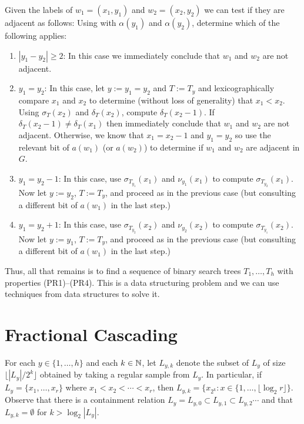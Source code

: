 \documentclass[kpfonts]{patmorin}
\begin{document}
Given the labels of $w_1=(x_1,y_1)$ and $w_2=(x_2,y_2)$ we can test if they are adjacent as follows: Using  with $\alpha(y_1)$ and $\alpha(y_2)$, determine which of the following applies:
\begin{enumerate}
  \item $|y_1-y_2|\ge 2$: In this case we immediately conclude that $w_1$ and $w_2$ are not adjacent.  
  
  \item $y_1=y_2$: In this case, let $y:=y_1=y_2$ and $T:=T_y$ and lexicographically compare $x_1$ and $x_2$ to determine (without loss of generality) that $x_1<x_2$.  Using $\sigma_{T}(x_2)$ and $\delta_{T}(x_2)$, compute $\delta_{T}(x_2-1)$.  If $\delta_{T}(x_2-1)\neq \delta_T(x_1)$ then immediately conclude that $w_1$ and $w_2$ are not adjacent.  Otherwise, we know that $x_1=x_2-1$ and $y_1=y_2$ so use the relevant bit of $a(w_1)$ (or $a(w_2)$) to determine if $w_1$ and $w_2$ are adjacent in $G$.
  
  \item $y_1=y_2-1$: In this case, use $\sigma_{T_{y_1}}(x_1)$ and $\nu_{y_1}(x_1)$ to compute $\sigma_{T_{y_2}}(x_1)$.  Now let $y:=y_2$, $T:=T_{y}$, and proceed as in the previous case (but consulting a different bit of $a(w_1)$ in the last step.)
  
  \item $y_1=y_2+1$: In this case, use $\sigma_{T_{y_2}}(x_2)$ and $\nu_{y_2}(x_2)$ to compute $\sigma_{T_{y_1}}(x_2)$.  Now let $y:=y_1$, $T:=T_{y}$, and proceed as in the previous case (but consulting a different bit of $a(w_1)$ in the last step.)
\end{enumerate}

Thus, all that remains is to find a sequence of binary search trees $T_1,\ldots,T_h$ with properties (PR1)--(PR4). This is a data structuring problem and we can use techniques from data structures to solve it.

\section{Fractional Cascading}

For each $y\in\{1,\ldots,h\}$ and each $k\in\mathbb{N}$, let $L_{y,k}$ denote the subset of $L_{y}$ of size $\lfloor|L_{y}|/2^k\rfloor$ obtained by taking a regular sample from $L_y$.  In particular, if $L_y=\{x_1,\ldots,x_r\}$ where $x_1<x_2<\cdots<x_r$, then $L_{y,k}=\{x_{2^k}:x\in\{1,\ldots,\lfloor\log_2 r\rfloor\}$.  Observe that there is a containment relation $L_y=L_{y,0}\subset L_{y,1}\subset L_{y,2} \cdots$ and that $L_{y,k}=\emptyset$ for $k>\log_2|L_y|$.
\end{document}

